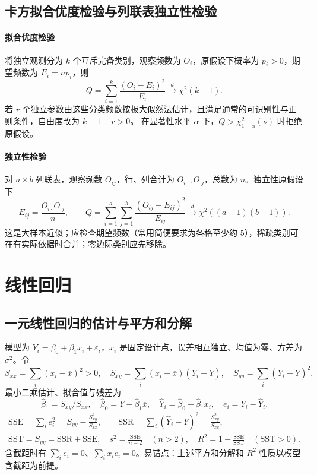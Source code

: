 \documentclass[../main.tex]{subfiles}
\begin{document}
\subsection{卡方拟合优度检验与列联表独立性检验}
\paragraph{拟合优度检验}
将独立观测分为 $k$ 个互斥完备类别，观察频数为 $O_i$，原假设下概率为 $p_i>0$，期望频数为 $E_i=np_i$，则
\[
Q=\sum_{i=1}^k\frac{(O_i-E_i)^2}{E_i}\xrightarrow{d}\chi^2(k-1).
\]
若 $r$ 个独立参数由这些分类频数按极大似然法估计，且满足通常的可识别性与正则条件，自由度改为 $k-1-r>0$。
在显著性水平 $\alpha$ 下，$Q>\chi^2_{1-\alpha}(\nu)$ 时拒绝原假设。
\paragraph{独立性检验}
对 $a\times b$ 列联表，观察频数 $O_{ij}$，行、列合计为 $O_{i\cdot},O_{\cdot j}$，总数为 $n$。独立性原假设下
\[
E_{ij}=\frac{O_{i\cdot}O_{\cdot j}}n,\qquad
Q=\sum_{i=1}^a\sum_{j=1}^b\frac{(O_{ij}-E_{ij})^2}{E_{ij}}
\xrightarrow{d}\chi^2((a-1)(b-1)).
\]
这是大样本近似；应检查期望频数（常用简便要求为各格至少约 $5$），稀疏类别可在有实际依据时合并；零边际类别应先移除。
\section{线性回归}
\subsection{一元线性回归的估计与平方和分解}
模型为 $Y_i=\beta_0+\beta_1x_i+\varepsilon_i$，$x_i$ 是固定设计点，误差相互独立、均值为零、方差为 $\sigma^2$。令
\[
S_{xx}=\sum_i(x_i-\overline x)^2>0,\quad
S_{xy}=\sum_i(x_i-\overline x)(Y_i-\overline Y),\quad
S_{yy}=\sum_i(Y_i-\overline Y)^2.
\]
最小二乘估计、拟合值与残差为
\[
\widehat\beta_1=S_{xy}/S_{xx},\quad
\widehat\beta_0=\overline Y-\widehat\beta_1\overline x,\quad
\widehat Y_i=\widehat\beta_0+\widehat\beta_1x_i,\quad e_i=Y_i-\widehat Y_i.
\]
\begin{gather*}
\mathrm{SSE}=\sum_i e_i^2=S_{yy}-\frac{S_{xy}^2}{S_{xx}},\qquad
\mathrm{SSR}=\sum_i(\widehat Y_i-\overline Y)^2=\frac{S_{xy}^2}{S_{xx}},\\
\mathrm{SST}=S_{yy}=\mathrm{SSR}+\mathrm{SSE},\quad
s^2=\frac{\mathrm{SSE}}{n-2}\quad(n>2),\quad
R^2=1-\frac{\mathrm{SSE}}{\mathrm{SST}}\quad(\mathrm{SST}>0).
\end{gather*}
含截距时有 $\sum_i e_i=0$、$\sum_i x_i e_i=0$。易错点：上述平方和分解和 $R^2$ 性质以模型含截距为前提。
\end{document}
